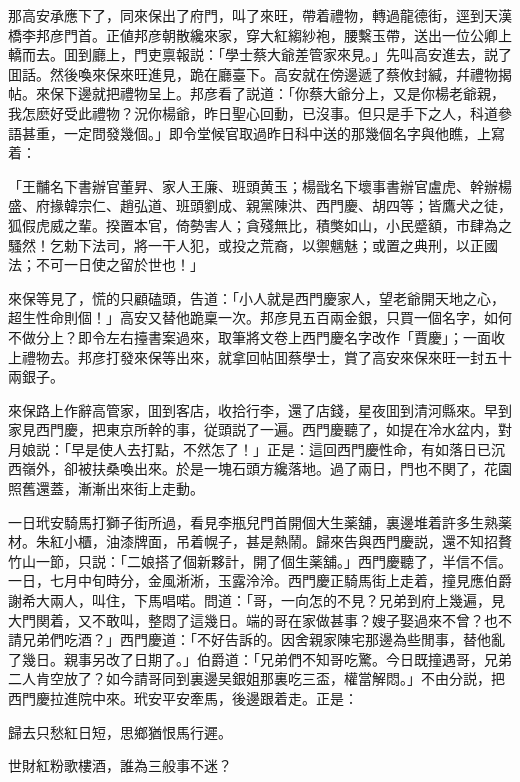 那高安承應下了，同來保出了府門，叫了來旺，帶着禮物，轉過龍德街，逕到天漢橋李邦彦門首。正値邦彦朝散纔來家，穿大紅縐紗袍，腰繫玉帶，送出一位公卿上轎而去。囬到廳上，門吏禀報説：「學士蔡大爺差管家來見。」先叫高安進去，説了囬話。然後喚來保來旺進見，跪在廳臺下。高安就在傍邊遞了蔡攸封緘，幷禮物揭帖。來保下邊就把禮物呈上。邦彦看了説道：「你蔡大爺分上，又是你楊老爺親，我怎麽好受此禮物？況你楊爺，昨日聖心回動，已沒事。但只是手下之人，科道參語甚重，一定問發幾個。」即令堂候官取過昨日科中送的那幾個名字與他瞧，上寫着：

\begin{myquote}[\markfont]
「王黼名下書辦官董昇、家人王廉、班頭黄玉；楊戩名下壞事書辦官盧虎、幹辦楊盛、府掾韓宗仁、趙弘道、班頭劉成、親黨陳洪、西門慶、胡四等；皆鷹犬之徒，狐假虎威之輩。揆置本官，倚勢害人；貪殘無比，積獘如山，小民蹙額，巿肆為之騷然！乞勅下法司，將一干人犯，或投之荒裔，以禦魑魅；或置之典刑，以正國法；不可一日使之留於世也！」
\end{myquote}

來保等見了，慌的只顧磕頭，告道：「小人就是西門慶家人，望老爺開天地之心，超生性命則個！」高安又替他跪稟一次。邦彦見五百兩金銀，只買一個名字，如何不做分上？即令左右擡書案過來，取筆將文卷上西門慶名字改作「賈慶」；一面收上禮物去。邦彦打發來保等出來，就拿回帖囬蔡學士，賞了高安來保來旺一封五十兩銀子。

來保路上作辭高管家，囬到客店，收拾行李，還了店錢，星夜囬到清河縣來。早到家見西門慶，把東京所幹的事，従頭説了一遍。西門慶聽了，如提在冷水盆内，對月娘説：「早是使人去打點，不然怎了！」正是：這回西門慶性命，有如落日已沉西嶺外，卻被扶桑喚出來。於是一塊石頭方纔落地。過了兩日，門也不関了，花園照舊還蓋，漸漸出來街上走動。

一日玳安騎馬打獅子街所過，看見李瓶兒門首開個大生薬舖，裏邊堆着許多生熟薬材。朱紅小櫃，油漆牌面，吊着幌子，甚是熱鬧。歸來告與西門慶説，還不知招贅竹山一節，只説：「二娘搭了個新夥計，開了個生薬舖。」西門慶聽了，半信不信。一日，七月中旬時分，金風淅淅，玉露泠泠。西門慶正騎馬街上走着，撞見應伯爵謝希大兩人，叫住，下馬唱喏。問道：「哥，一向怎的不見？兄弟到府上幾遍，見大門関着，又不敢叫，整悶了這幾日。端的哥在家做甚事？嫂子娶過來不曾？也不請兄弟們吃酒？」西門慶道：「不好告訴的。因舍親家陳宅那邊為些閒事，替他亂了幾日。親事另改了日期了。」伯爵道：「兄弟們不知哥吃驚。今日既撞遇哥，兄弟二人肯空放了？如今請哥同到裏邊吴銀姐那裏吃三盃，權當解悶。」不由分説，把西門慶拉進院中來。玳安平安牽馬，後邊跟着走。正是：

\begin{myquote}
歸去只愁紅日短，思鄉猶恨馬行遲。

世財紅粉歌樓酒，誰為三般事不迷？
\end{myquote}

